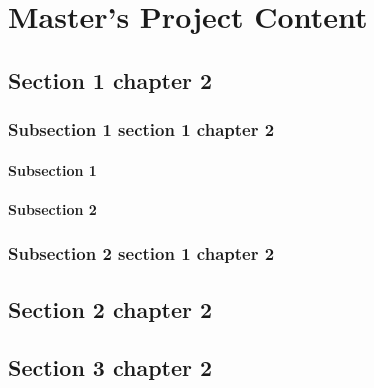\chapter{Master’s Project Content}


\section{Section 1 chapter 2}

\subsection{Subsection 1 section 1 chapter 2}

\subsubsection{Subsection 1}

\subsubsection{Subsection 2}

\subsection{Subsection 2 section 1 chapter 2}

\section{Section 2 chapter 2}

\section{Section 3 chapter	 2}
